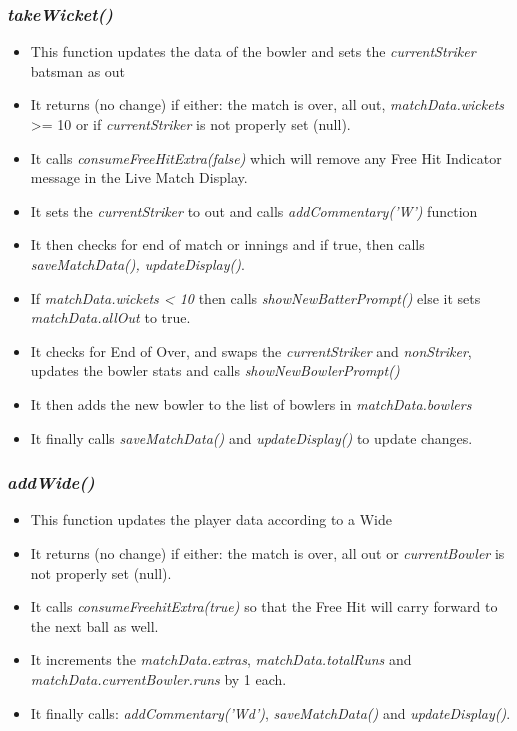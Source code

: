 \documentclass[a4paper,12pt]{article}
\begin{document}
\subsubsection{\textit{takeWicket()}}
\begin{itemize}
\item This function updates the data of the bowler and sets the \textit{currentStriker} batsman as out
\item It returns (no change) if either: the match is over, all out, \textit{matchData.wickets} >= 10 or if \textit{currentStriker} is not properly set (null).
\item It calls \textit{consumeFreeHitExtra(false)} which will remove any Free Hit Indicator message in the Live Match Display.
\item It sets the \textit{currentStriker} to out and calls \textit{addCommentary('W')} function
\item It then checks for end of match or innings and if true, then calls \textit{saveMatchData(), updateDisplay()}.
\item If \textit{matchData.wickets < 10} then calls \textit{showNewBatterPrompt()} else it sets \textit{matchData.allOut} to true.
\item It checks for End of Over, and swaps the \textit{currentStriker} and \textit{nonStriker}, updates the bowler stats and calls \textit{showNewBowlerPrompt()}
\item It then adds the new bowler to the list of bowlers in \textit{matchData.bowlers}
\item It finally calls \textit{saveMatchData()} and \textit{updateDisplay()} to update changes.
\end{itemize}

\subsubsection{\textit{addWide()}}
\label{wide}
\begin{itemize}
\item This function updates the player data according to a Wide 
\item It returns (no change) if either: the match is over, all out or \textit{currentBowler} is not properly set (null).
\item It calls \textit{consumeFreehitExtra(true)} so that the Free Hit will carry forward to the next ball as well.
\item It increments the \textit{matchData.extras}, \textit{matchData.totalRuns} and \textit{matchData.currentBowler.runs} by 1 each.
\item It finally calls: \textit{addCommentary('Wd')}, \textit{saveMatchData()} and \textit{updateDisplay()}.
\end{itemize}
\end{document}
